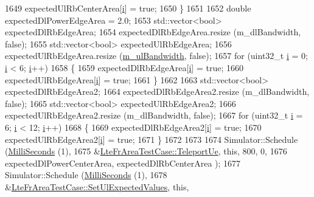 \begin{DoxyCode}
1649       expectedUlRbCenterArea[\hyperlink{bernuolliDistribution_8m_a6f6ccfcf58b31cb6412107d9d5281426}{i}] = \textcolor{keyword}{true};
1650     \}
1651 
1652   \textcolor{keywordtype}{double} expectedDlPowerEdgeArea = 2.0;
1653   std::vector<bool> expectedDlRbEdgeArea;
1654   expectedDlRbEdgeArea.resize (m\_dlBandwidth, \textcolor{keyword}{false});
1655   std::vector<bool> expectedUlRbEdgeArea;
1656   expectedUlRbEdgeArea.resize (\hyperlink{classLteFrAreaTestCase_afa54487d9f12658bbead39e1272f4d8c}{m\_ulBandwidth}, \textcolor{keyword}{false});
1657   \textcolor{keywordflow}{for} (uint32\_t \hyperlink{bernuolliDistribution_8m_a6f6ccfcf58b31cb6412107d9d5281426}{i} = 0; \hyperlink{bernuolliDistribution_8m_a6f6ccfcf58b31cb6412107d9d5281426}{i} < 6; \hyperlink{bernuolliDistribution_8m_a6f6ccfcf58b31cb6412107d9d5281426}{i}++)
1658     \{
1659       expectedDlRbEdgeArea[\hyperlink{bernuolliDistribution_8m_a6f6ccfcf58b31cb6412107d9d5281426}{i}] = \textcolor{keyword}{true};
1660       expectedUlRbEdgeArea[\hyperlink{bernuolliDistribution_8m_a6f6ccfcf58b31cb6412107d9d5281426}{i}] = \textcolor{keyword}{true};
1661     \}
1662 
1663   std::vector<bool> expectedDlRbEdgeArea2;
1664   expectedDlRbEdgeArea2.resize (m\_dlBandwidth, \textcolor{keyword}{false});
1665   std::vector<bool> expectedUlRbEdgeArea2;
1666   expectedUlRbEdgeArea2.resize (m\_dlBandwidth, \textcolor{keyword}{false});
1667   \textcolor{keywordflow}{for} (uint32\_t \hyperlink{bernuolliDistribution_8m_a6f6ccfcf58b31cb6412107d9d5281426}{i} = 6; \hyperlink{bernuolliDistribution_8m_a6f6ccfcf58b31cb6412107d9d5281426}{i} < 12; \hyperlink{bernuolliDistribution_8m_a6f6ccfcf58b31cb6412107d9d5281426}{i}++)
1668     \{
1669       expectedDlRbEdgeArea2[\hyperlink{bernuolliDistribution_8m_a6f6ccfcf58b31cb6412107d9d5281426}{i}] = \textcolor{keyword}{true};
1670       expectedUlRbEdgeArea2[\hyperlink{bernuolliDistribution_8m_a6f6ccfcf58b31cb6412107d9d5281426}{i}] = \textcolor{keyword}{true};
1671     \}
1672 
1673 
1674   Simulator::Schedule (\hyperlink{group__timecivil_gaf26127cf4571146b83a92ee18679c7a9}{MilliSeconds} (1),
1675                        &\hyperlink{classLteFrAreaTestCase_ad644210c338d4e34da3c5d7f0c511269}{LteFrAreaTestCase::TeleportUe}, \textcolor{keyword}{this}, 800, 0,
1676                        expectedDlPowerCenterArea, expectedDlRbCenterArea );
1677   Simulator::Schedule (\hyperlink{group__timecivil_gaf26127cf4571146b83a92ee18679c7a9}{MilliSeconds} (1),
1678                        &\hyperlink{classLteFrAreaTestCase_aac2718dc3703d2ad389f88ffa20d035e}{LteFrAreaTestCase::SetUlExpectedValues}, \textcolor{keyword}{this},

\end{DoxyCode}
